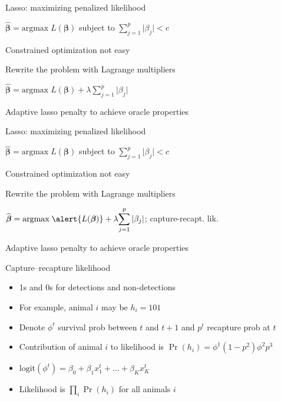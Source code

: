 \documentclass[14pt]{beamer}
\begin{document}
\begin{frame}[fragile]{Lasso: maximizing penalized likelihood}

$\widehat{\boldsymbol{\beta}} = \text{argmax} \; L(\boldsymbol{\beta})$ subject to $\displaystyle{\sum_{j=1}^{p}{\lvert \beta_j \rvert}} < c$

Constrained optimization not easy

Rewrite the problem with Lagrange multipliers

$\widehat{\boldsymbol{\beta}} = {\text{argmax} \; L(\boldsymbol{\beta})} + \lambda \displaystyle{\sum_{j=1}^{p}{\lvert \beta_j \rvert}}$

Adaptive lasso penalty to achieve oracle properties

\end{frame}

\begin{frame}[fragile]{Lasso: maximizing penalized likelihood}

$\widehat{\boldsymbol{\beta}} = \text{argmax} \; L(\boldsymbol{\beta})$ subject to $\displaystyle{\sum_{j=1}^{p}{\lvert \beta_j \rvert}} < c$

Constrained optimization not easy

Rewrite the problem with Lagrange multipliers

$\widehat{\boldsymbol{\beta}} = \text{argmax} \; \alert{L(\boldsymbol{\beta})} + \lambda \displaystyle{\sum_{j=1}^{p}{\lvert \beta_j \rvert}}$; \alert{capture-recapt. lik.}

Adaptive lasso penalty to achieve oracle properties

\end{frame}

\begin{frame}[fragile]{Capture--recapture likelihood}

\begin{itemize}
\item 1s and 0s for detections and non-detections
\item For example, animal $i$ may be $h_i = 101$
\item Denote $\phi^t$ survival prob between $t$ and $t+1$ and $p^t$ recapture prob at $t$ 
\item Contribution of animal $i$ to likelihood is $\Pr(h_i) = \phi^1 (1-p^2) \phi^2 p^3$
\item $\text{logit}(\phi^t) = \beta_0 + \beta_1 x_1^t + \ldots + \beta_{K} x^t_{K}$
\item Likelihood is $\displaystyle{\prod_i \Pr(h_i)}$ for all animals $i$
\end{itemize}

\end{frame}
\end{document}
